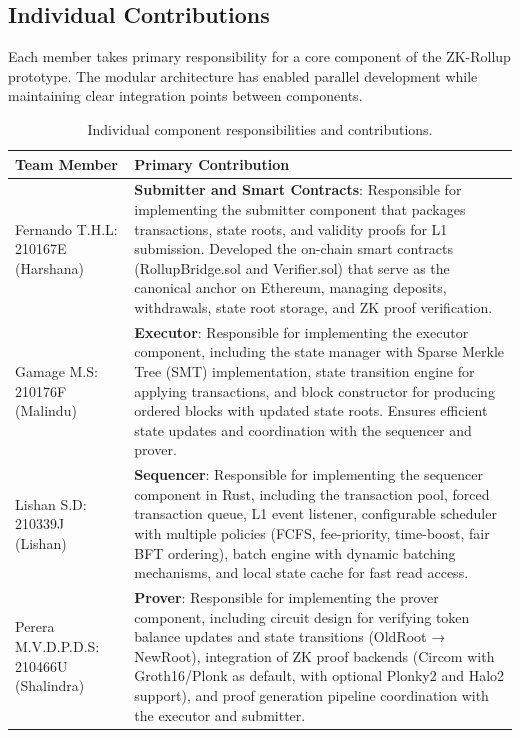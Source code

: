 \vspace{12pt}


\vspace{12pt}
\subsection{Individual Contributions}
\vspace{12pt}
Each member takes primary responsibility for a core component of the ZK-Rollup prototype. The modular architecture has enabled parallel development while maintaining clear integration points between components.

\vspace{12pt}
\begin{table}[H]
\centering
\begin{tabular}{|l|p{10cm}|}
\hline
\textbf{Team Member} & \textbf{Primary Contribution} \\ \hline
Fernando T.H.L: 210167E (Harshana) & \textbf{Submitter and Smart Contracts}: Responsible for implementing the submitter component that packages transactions, state roots, and validity proofs for L1 submission. Developed the on-chain smart contracts (RollupBridge.sol and Verifier.sol) that serve as the canonical anchor on Ethereum, managing deposits, withdrawals, state root storage, and ZK proof verification. \\ \hline
Gamage M.S: 210176F (Malindu) & \textbf{Executor}: Responsible for implementing the executor component, including the state manager with Sparse Merkle Tree (SMT) implementation, state transition engine for applying transactions, and block constructor for producing ordered blocks with updated state roots. Ensures efficient state updates and coordination with the sequencer and prover. \\ \hline
Lishan S.D: 210339J (Lishan) & \textbf{Sequencer}: Responsible for implementing the sequencer component in Rust, including the transaction pool, forced transaction queue, L1 event listener, configurable scheduler with multiple policies (FCFS, fee-priority, time-boost, fair BFT ordering), batch engine with dynamic batching mechanisms, and local state cache for fast read access. \\ \hline
Perera M.V.D.P.D.S: 210466U (Shalindra) & \textbf{Prover}: Responsible for implementing the prover component, including circuit design for verifying token balance updates and state transitions (OldRoot → NewRoot), integration of ZK proof backends (Circom with Groth16/Plonk as default, with optional Plonky2 and Halo2 support), and proof generation pipeline coordination with the executor and submitter. \\ \hline
\end{tabular}
\caption{Individual component responsibilities and contributions.}
\label{tab:individual-contributions}
\end{table}

